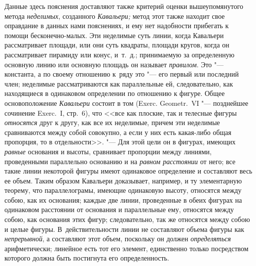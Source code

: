 Данные здесь пояснения доставляют также критерий оценки вышеупомянутого метода
{\em неделимых}, созданного {\em Кавальери;} метод этот также находит свое
оправдание в данных нами пояснениях, и ему нет надобности прибегать к помощи
бесконечно-малых. Эти неделимые суть линии, когда Кавальери рассматривает
площади, или они суть квадраты, площади кругов, когда он рассматривает пирамиду
или конус, и~т.~д.; принимаемую за определенную основную линию или основную
площадь он называет {\em правилом}. Это "--- константа, а по своему отношению
к~ряду это "--- его первый или последний член; неделимые рассматриваются как
параллельные ей, следовательно, как находящиеся в одинаковом определении по
отношению к фигуре. Общее основоположение {\em Кавальери} состоит в том (Exerc.
Geo\-metr.~VI "--- позднейшее сочинение Exerc.~I, стр.~6), что <<все как
плоские, так и телесные фигуры {\em относятся} друг к другу, как все их
неделимые, причем эти неделимые сравниваются между собой
совокупно, а если у них есть какая-либо общая пропорция, то в отдельности>>.
"--- Для этой цели он в фигурах, имеющих {\em равные} основания и высоты,
сравнивает пропорции между линиями, проведенными параллельно основанию и на
{\em равном расстоянии} от него; все такие линии некоторой фигуры имеют
одинаковое определение и составляют весь ее объем. Таким образом Кавальери
доказывает, например, и ту элементарную теорему, что параллелограмы, имеющие
одинаковую высоту, относятся между собою, как их основания; каждые две линии,
проведенные в обеих фигурах на одинаковом расстоянии от основания и
параллельные ему, относятся между собою, как основания этих фигур;
следовательно, так же относятся между собою и целые фигуры. В~действительности
линии не составляют объема фигуры как {\em непрерывной}, а составляют этот
объем, поскольку он должен {\em определяться} арифметически; линейное есть тот
его элемент, единственно только посредством которого должна быть постигнута его
определенность.

